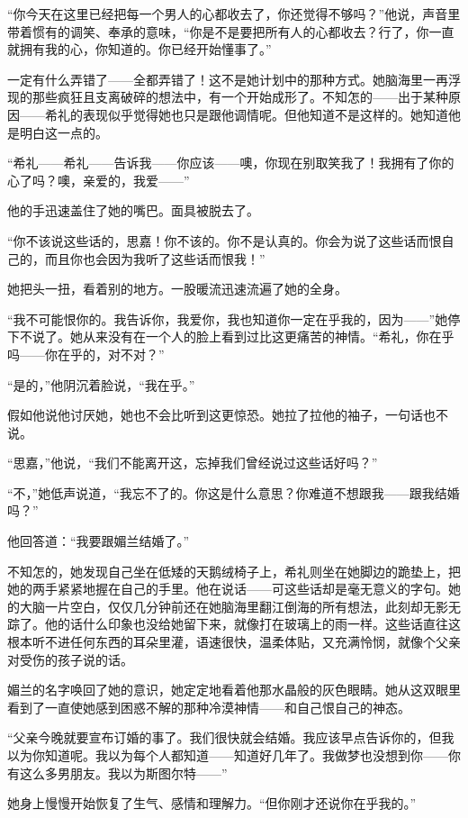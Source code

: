 \par “你今天在这里已经把每一个男人的心都收去了，你还觉得不够吗？”他说，声音里带着惯有的调笑、奉承的意味，“你是不是要把所有人的心都收去？行了，你一直就拥有我的心，你知道的。你已经开始懂事了。”
\par 一定有什么弄错了——全都弄错了！这不是她计划中的那种方式。她脑海里一再浮现的那些疯狂且支离破碎的想法中，有一个开始成形了。不知怎的——出于某种原因——希礼的表现似乎觉得她也只是跟他调情呢。但他知道不是这样的。她知道他是明白这一点的。
\par “希礼——希礼——告诉我——你应该——噢，你现在别取笑我了！我拥有了你的心了吗？噢，亲爱的，我爱——”
\par 他的手迅速盖住了她的嘴巴。面具被脱去了。
\par “你不该说这些话的，思嘉！你不该的。你不是认真的。你会为说了这些话而恨自己的，而且你也会因为我听了这些话而恨我！”
\par 她把头一扭，看着别的地方。一股暖流迅速流遍了她的全身。
\par “我不可能恨你的。我告诉你，我爱你，我也知道你一定在乎我的，因为——”她停下不说了。她从来没有在一个人的脸上看到过比这更痛苦的神情。“希礼，你在乎吗——你在乎的，对不对？”
\par “是的，”他阴沉着脸说，“我在乎。”
\par 假如他说他讨厌她，她也不会比听到这更惊恐。她拉了拉他的袖子，一句话也不说。
\par “思嘉，”他说，“我们不能离开这，忘掉我们曾经说过这些话好吗？”
\par “不，”她低声说道，“我忘不了的。你这是什么意思？你难道不想跟我——跟我结婚吗？”
\par 他回答道：“我要跟媚兰结婚了。”
\par 不知怎的，她发现自己坐在低矮的天鹅绒椅子上，希礼则坐在她脚边的跪垫上，把她的两手紧紧地握在自己的手里。他在说话——可这些话却是毫无意义的字句。她的大脑一片空白，仅仅几分钟前还在她脑海里翻江倒海的所有想法，此刻却无影无踪了。他的话什么印象也没给她留下来，就像打在玻璃上的雨一样。这些话直往这根本听不进任何东西的耳朵里灌，语速很快，温柔体贴，又充满怜悯，就像个父亲对受伤的孩子说的话。
\par 媚兰的名字唤回了她的意识，她定定地看着他那水晶般的灰色眼睛。她从这双眼里看到了一直使她感到困惑不解的那种冷漠神情——和自己恨自己的神态。
\par “父亲今晚就要宣布订婚的事了。我们很快就会结婚。我应该早点告诉你的，但我以为你知道呢。我以为每个人都知道——知道好几年了。我做梦也没想到你——你有这么多男朋友。我以为斯图尔特——”
\par 她身上慢慢开始恢复了生气、感情和理解力。“但你刚才还说你在乎我的。”
